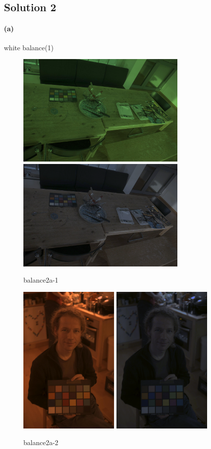 \documentclass{article}
\newcommand{\solution}[1]{\clearpage \subsection*{Solution #1}}  %
\newcommand{\spart}[1]{\paragraph{(#1)}}
\begin{document}
\solution{2}

\spart{a}
white balance(1)
\begin{figure}[h!]
  \centering
  	\includegraphics[height=15em]{code/inputs/cc/ex1.jpg}
	\includegraphics[height=15em]{code/outputs/prob2a_1.png}
	  \caption{balance2a-1}
\end{figure}

\begin{figure}[h!]
  \centering
  	\includegraphics[height=20em]{code/inputs/cc/ex2.jpg}
	\includegraphics[height=20em]{code/outputs/prob2a_2.png}
	  \caption{balance2a-2}
\end{figure}
\newpage
\end{document}
